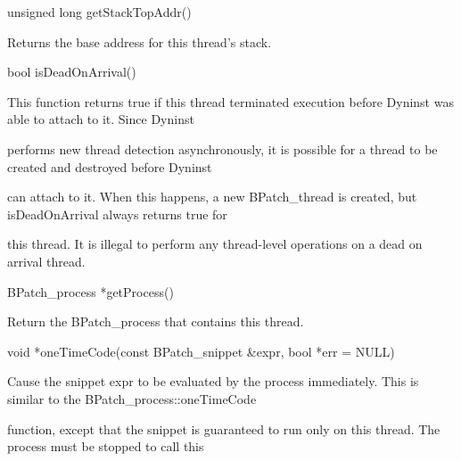 {{{

unsigned long getStackTopAddr()}



{

Returns the base address for this thread's stack.





\bigskip



{

bool isDeadOnArrival()}



{

This function returns true if this thread terminated execution before Dyninst was able to attach to it. Since Dyninst

performs new thread detection asynchronously, it is possible for a thread to be created and destroyed before Dyninst

can attach to it. When this happens, a new BPatch_thread is created, but isDeadOnArrival always returns true for

this thread. It is illegal to perform any thread-level operations on a dead on arrival thread.}





\bigskip



{

BPatch_process *getProcess()}



{

Return the BPatch_process that contains this thread.}





\bigskip



{

void *oneTimeCode(const BPatch_snippet &expr, bool *err = NULL)



{

Cause the snippet expr to be evaluated by the process immediately. This is similar to the BPatch_process::oneTimeCode

function, except that the snippet is guaranteed to run only on this thread. The process must be stopped to call this

}}}}}

